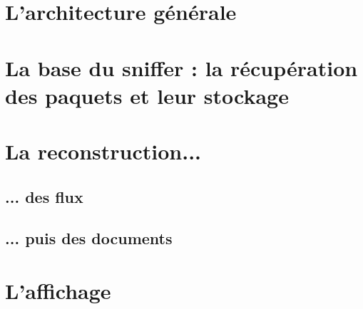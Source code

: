 

\section{L'architecture générale}

\section{La base du sniffer : la récupération des paquets et leur stockage}

\section{La reconstruction...}
\subsection{... des flux}
\subsection{... puis des documents}
% 

\section{L'affichage}

